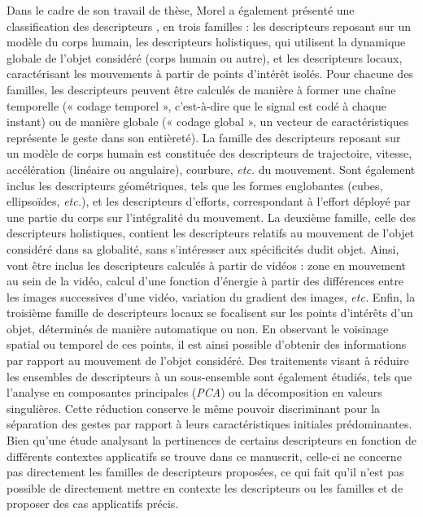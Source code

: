 Dans le cadre de son travail de thèse, Morel a également présenté une classification des descripteurs \parencite{Morel2017Mts}, en trois familles : les descripteurs reposant sur un modèle du corps humain, les descripteurs holistiques, qui utilisent la dynamique globale de l'objet considéré (corps humain ou autre), et les descripteurs locaux, caractérisant les mouvements à partir de points d'intérêt isolés. Pour chacune des familles, les descripteurs peuvent être calculés de manière à former une chaîne temporelle (« codage temporel », c'est-à-dire que le signal est codé à chaque instant) ou de manière globale (« codage global », un vecteur de caractéristiques représente le geste dans son entièreté). La famille des descripteurs reposant sur un modèle de corps humain est constituée des descripteurs de trajectoire, vitesse, accélération (linéaire ou angulaire), courbure, \textit{etc.} du mouvement. Sont également inclus les descripteurs géométriques, tels que les formes englobantes (cubes, ellipsoïdes, \textit{etc.}), et les descripteurs d'efforts, correspondant à l'effort déployé par une partie du corps sur l'intégralité du mouvement. La deuxième famille, celle des descripteurs holistiques, contient les descripteurs relatifs au mouvement de l'objet considéré dans sa globalité, sans s'intéresser aux spécificités dudit objet. Ainsi, vont être inclus les descripteurs calculés à partir de vidéos : zone en mouvement au sein de la vidéo, calcul d'une fonction d'énergie à partir des différences entre les images successives d'une vidéo, variation du gradient des images, \textit{etc.} Enfin, la troisième famille de descripteurs locaux se focalisent sur les points d'intérêts d'un objet, déterminés de manière automatique ou non. En observant le voisinage spatial ou temporel de ces points, il est ainsi possible d'obtenir des informations par rapport au mouvement de l'objet considéré. Des traitements visant à réduire les ensembles de descripteurs à un sous-ensemble sont également étudiés, tels que l'analyse en composantes principales (\textit{PCA}) ou la décomposition en valeurs singulières. Cette réduction conserve le même pouvoir discriminant pour la séparation des gestes par rapport à leurs caractéristiques initiales prédominantes. Bien qu'une étude analysant la pertinences de certains descripteurs en fonction de différents contextes applicatifs se trouve dans ce manuscrit, celle-ci ne concerne pas directement les familles de descripteurs proposées, ce qui fait qu'il n'est pas possible de directement mettre en contexte les descripteurs ou les familles et de proposer des cas applicatifs précis.


